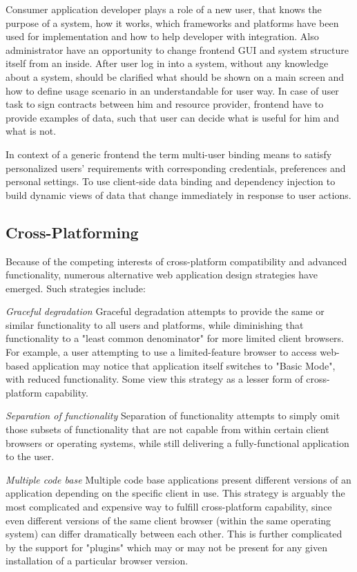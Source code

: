 	Consumer application developer plays a role of a new user, that knows the purpose of a system, how it works, which frameworks and platforms have been used for implementation and how to help developer with integration. Also administrator have an opportunity to change frontend GUI and system structure itself from an inside.
	\newline
	After user log in into a system, without any knowledge about a system, should be clarified what should be shown on a main screen and how to define usage scenario in an understandable for user way. In case of user task to sign contracts between him and resource provider, frontend have to provide examples of data, such that user can decide what is useful for him and what is not.

	In context of a generic frontend the term multi-user binding means to satisfy personalized users' requirements with corresponding credentials, preferences and personal settings. To use client-side data binding and dependency injection to build dynamic views of data that change immediately in response to user actions.

\subsection {Cross-Platforming}
	Because of the competing interests of cross-platform compatibility and advanced functionality, numerous alternative web application design strategies have emerged. Such strategies include:

	\emph{Graceful degradation}
	\newline
	Graceful degradation attempts to provide the same or similar functionality to all users and platforms, while diminishing that functionality to a "least common denominator" for more limited client browsers. For example, a user attempting to use a limited-feature browser to access web-based application may notice that application itself switches to "Basic Mode", with reduced functionality. Some view this strategy as a lesser form of cross-platform capability.

	\emph{Separation of functionality}
	\newline
	Separation of functionality attempts to simply omit those subsets of functionality that are not capable from within certain client browsers or operating systems, while still delivering a fully-functional application to the user.

	\emph{Multiple code base}
	\newline
	Multiple code base applications present different versions of an application depending on the specific client in use. This strategy is arguably the most complicated and expensive way to fulfill cross-platform capability, since even different versions of the same client browser (within the same operating system) can differ dramatically between each other. This is further complicated by the support for "plugins" which may or may not be present for any given installation of a particular browser version.

